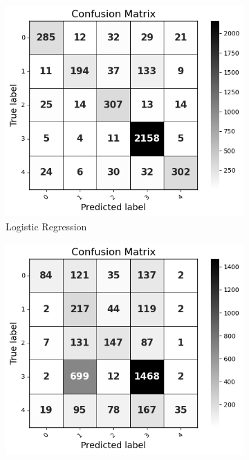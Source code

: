 \begin{figure}[H]
    \vspace{0.5cm}

    \begin{subfigure}[b]{0.49\textwidth}
        \centering
        \includegraphics[width=\textwidth]{Images/HP LR CM.png}
        \vspace{-0.8cm}
        \caption{Logistic Regression}
        \label{LSTMROC2}  %
    \end{subfigure}
    \hfill
    \vspace{0.25cm}
    \begin{subfigure}[b]{0.49\textwidth}
        \centering
        \includegraphics[width=\textwidth]{Images/HP KNN CM.png}

\end{subfigure}
\end{figure}
